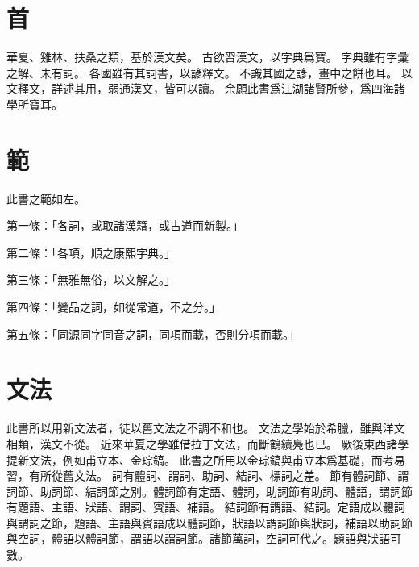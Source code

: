 \section{首}
華夏、雞林、扶桑之類，基於漢文矣。
古欲習漢文，以字典爲寶。
字典雖有字彙之解、未有詞。
各國雖有其詞書，以諺釋文。
不識其國之諺，畫中之餅也耳。
以文釋文，詳述其用，弱通漢文，皆可以讀。
余願此書爲江湖諸賢所參，爲四海諸學所寶耳。
\section{範}
此書之範如左。
\par 第一條：「各詞，或取諸漢籍，或古道而新製。」
\par 第二條：「各項，順之康熙字典。」
\par 第三條：「無雅無俗，以文解之。」
\par 第四條：「變品之詞，如從常道，不之分。」
\par 第五條：「同源同字同音之詞，同項而載，否則分項而載。」
\section{文法}
此書所以用新文法者，徒以舊文法之不調不和也。
文法之學始於希臘，雖與洋文相類，漢文不從。
近來華夏之學雖借拉丁文法，而斷鶴續鳧也已。
厥後東西諸學提新文法，例如甫立本、金琮鎬。
此書之所用以金琮鎬與甫立本爲基礎，而考易習，有所從舊文法。
詞有體詞、謂詞、助詞、結詞、標詞之差。
節有體詞節、謂詞節、助詞節、結詞節之別。體詞節有定語、體詞，助詞節有助詞、體語，謂詞節有題語、主語、狀語、謂詞、賓語、補語。
結詞節有謂語、結詞。定語成以體詞與謂詞之節，題語、主語與賓語成以體詞節，狀語以謂詞節與狀詞，補語以助詞節與空詞，體語以體詞節，謂語以謂詞節。諸節萬詞，空詞可代之。題語與狀語可數。
